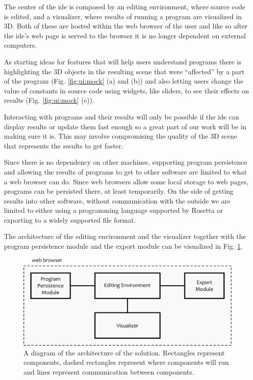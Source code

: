\documentclass{./llncs2e/llncs}
\begin{document}
	The center of the \ac{ide} is composed by an editing environment, where source code is edited, and a visualizer, where results of running a program are visualized in 3D.
	Both of these are hosted within the web browser of the user and like so after the \ac{ide}'s web page is served to the browser it is no longer dependent on external computers.
	
	As starting ideas for features that will help users understand programs there is highlighting the 3D objects in the resulting scene that were ``affected'' by a part of the program (Fig. \ref{fig:ui:mock} (a) and (b)) and also letting users change the value of constants in source code using widgets, like sliders, to see their effects on results (Fig. \ref{fig:ui:mock} (c)).
	
	Interacting with programs and their results will only be possible if the \ac{ide} can display results or update them fast enough so a great part of our work will be in making sure it is.
	This may involve compromising the quality of the 3D scene that represents the results to get faster.
	
	Since there is no dependency on other machines, supporting program persistence and allowing the results of programs to get to other software are limited to what a web browser can do.
	Since web browsers allow some local storage to web pages, programs can be persisted there, at least temporarily.
	On the side of getting results into other software, without communication with the outside we are limited to either using a programming language supported by Rosetta or exporting to a widely supported file format.
	
	The architecture of the editing environment and the visualizer together with the program persistence module and the export module can be visualized in Fig. \ref{fig:gen:sol}.
	
	\begin{figure}
		\centering
		\includegraphics[width=1.0\textwidth]{img/gen_sol}
		\caption{A diagram of the architecture of the solution. Rectangles represent components, dashed rectangles represent where components will run and lines represent communication between components.}
		\label{fig:gen:sol}
	\end{figure}	
\end{document}
